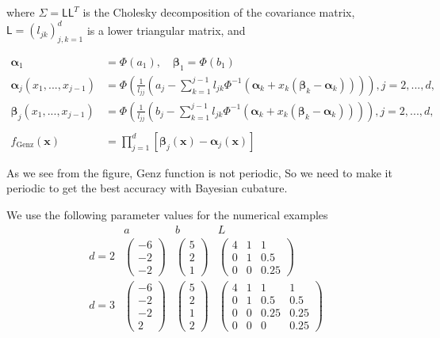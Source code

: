 \documentclass[smallextended]{svjour3}       %
\newcommand{\bm}[1]{\boldsymbol{#1}}
\newcommand{\mSigma}{\Sigma}
\newcommand{\valpha}{{\bm{\alpha}}}
\newcommand{\vbeta}{{\bm{\beta}}}
\newcommand{\vx}{\bm{x}}
\newcommand{\mL}{\mathsf{L}}
\begin{document}
\begin{enumerate}
where $\mSigma= \mL \mL^T$ is the Cholesky decomposition of the covariance matrix, $\mL = (l_{jk})_{j,k=1}^d$ is a lower triangular matrix, and

\begin{align*}
\valpha_1 &= \Phi(a_1), \quad \vbeta_1 = \Phi(b_1)
\\
\valpha_j(x_1,...,x_{j-1}) &= \Phi
\left(
\frac{1}{l_{jj}} 
\left(
a_j - \sum_{k=1}^{j-1} l_{jk} \Phi^{-1}(\valpha_k + x_k(\vbeta_k-\valpha_k))
\right)
\right), j=2,...,d,
\\
\vbeta_j(x_1,...,x_{j-1}) &= \Phi
\left(
\frac{1}{l_{jj}} 
\left(
b_j - \sum_{k=1}^{j-1} l_{jk} \Phi^{-1}(\valpha_k + x_k(\vbeta_k-\valpha_k))
\right)
\right), j=2,...,d,
\\
\\
f_{\text{Genz}}(\vx) &= \prod_{j=1}^d [\vbeta_j(\vx) - \valpha_j(\vx)]
\end{align*}

As we see from the figure, Genz function is not periodic, So we need to make it periodic to get the best accuracy with Bayesian cubature.


We use the following parameter values for the numerical examples
\begin{equation*}
\begin{array}{c|ccc}
 & a  & b & L  \\
\hline
d=2 
 & 
\begin{pmatrix}
-6 \\ -2 \\ -2
\end{pmatrix}
 & 
\begin{pmatrix}
5 \\ 2 \\ 1
\end{pmatrix} 
 & 
\begin{pmatrix}
4 & 1 & 1 \\ 0 & 1 & 0.5 \\ 0 & 0 & 0.25
\end{pmatrix} 
\\
d=3
 & 
\begin{pmatrix}
-6 \\ -2 \\ -2 \\ 2
\end{pmatrix}
 & 
\begin{pmatrix}
5 \\ 2 \\ 1 \\2
\end{pmatrix} 
 & 
\begin{pmatrix}
4 & 1 & 1 & 1\\ 0 & 1 & 0.5 & 0.5 \\ 0 & 0 & 0.25 & 0.25 \\ 0 & 0 & 0 & 0.25
\end{pmatrix} 
\end{array}
\end{equation*}


\end{enumerate}
\end{document}
